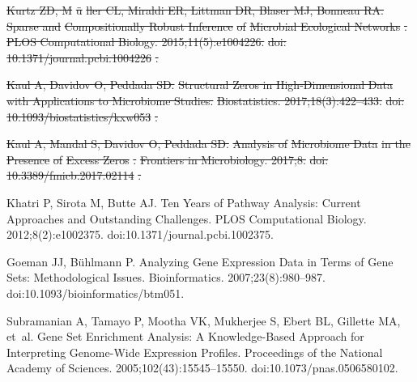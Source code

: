 \documentclass[10pt,letterpaper]{article}
\providecommand{\DIFdeltex}[1]{{\protect\color{red}\sout{#1}}}                      %
\providecommand{\DIFdelend}{} %
\providecommand{\DIFdel}[1]{\texorpdfstring{\DIFdeltex{#1}}{}} %
\DeclareRobustCommand{\DIFdelend}{\DIFOaddend \let\includegraphics\DIFOincludegraphics} %
\begin{document}
\begin{thebibliography}{10}
\DIFdel{Kurtz ZD, M}%
\DIFdel{\"u}%
\DIFdel{ller CL, Miraldi ER, Littman DR, Blaser MJ, Bonneau RA.
}%
\DIFdel{Sparse and }%
\DIFdel{Compositionally Robust Inference}%
\DIFdel{of }%
\DIFdel{Microbial
  Ecological Networks}%
\DIFdel{.
}%
\DIFdel{PLOS Computational Biology. 2015;11(5):e1004226.
}%
\DIFdel{doi:}%
\DIFdel{10.1371/journal.pcbi.1004226}%
\DIFdel{.
}%

\DIFdel{Kaul A, Davidov O, Peddada SD.
}%
\DIFdel{Structural Zeros in High-Dimensional Data with Applications to
  Microbiome Studies.
}%
\DIFdel{Biostatistics. 2017;18(3):422--433.
}%
\DIFdel{doi:}%
\DIFdel{10.1093/biostatistics/kxw053}%
\DIFdel{.
}%

\DIFdel{Kaul A, Mandal S, Davidov O, Peddada SD.
}%
\DIFdel{Analysis of }%
\DIFdel{Microbiome Data}%
\DIFdel{in the }%
\DIFdel{Presence}%
\DIFdel{of }%
\DIFdel{Excess
  Zeros}%
\DIFdel{.
}%
\DIFdel{Frontiers in Microbiology. 2017;8.
}%
\DIFdel{doi:}%
\DIFdel{10.3389/fmicb.2017.02114}%
\DIFdel{.
}%

\DIFdelend {}
Khatri P, Sirota M, Butte AJ.
\newblock Ten {{Years}} of {{Pathway Analysis}}: {{Current Approaches}} and
  {{Outstanding Challenges}}.
\newblock PLOS Computational Biology. 2012;8(2):e1002375.
\newblock doi:{10.1371/journal.pcbi.1002375}.

Goeman JJ, B{\"u}hlmann P.
\newblock Analyzing Gene Expression Data in Terms of Gene Sets: Methodological
  Issues.
\newblock Bioinformatics. 2007;23(8):980--987.
\newblock doi:{10.1093/bioinformatics/btm051}.

Subramanian A, Tamayo P, Mootha VK, Mukherjee S, Ebert BL, Gillette MA, et~al.
\newblock Gene Set Enrichment Analysis: {{A}} Knowledge-Based Approach for
  Interpreting Genome-Wide Expression Profiles.
\newblock Proceedings of the National Academy of Sciences.
  2005;102(43):15545--15550.
\newblock doi:{10.1073/pnas.0506580102}.


\end{thebibliography}
\end{document}
